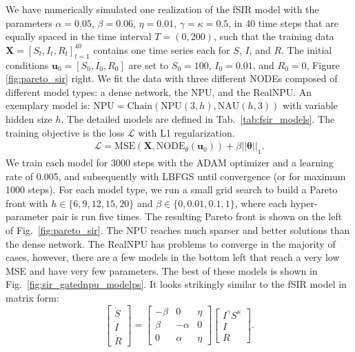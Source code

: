 \documentclass[9pt]{article}
\newcommand{\npu}{\text{NPU}}
\newcommand{\nau}{\text{NAU}}
\newcommand{\chain}{\text{Chain}}
\renewcommand{\arraystretch}{1.2}
\begin{document}
We have numerically simulated one realization of the fSIR model with the
parameters $\alpha=0.05$, $\beta=0.06$, $\eta=0.01$, $\gamma=\kappa=0.5$, in 40
time steps that are equally spaced in the time interval $T=(0,200)$, such that
the training data $\bm X = [S_t,I_t,R_t]_{t=1}^{40}$
contains one time series each for $S$, $I$, and $R$.  The initial conditions
$\bm u_0=[S_0,I_0,R_0]$ are set to $S_0=100$, $I_0=0.01$, and $R_0=0$, Figure
\ref{fig:pareto_sir} right.
We fit the data with three
different NODEs composed of different model types: a dense network, the NPU, and
the RealNPU. An exemplary model is: $\npu=\chain(\npu(3,h),\nau(h,3))$ with
variable hidden size $h$.  The detailed models are defined in
Tab.~\ref{tab:fsir_models}. The training objective is the loss $\mathcal{L}$
with L1 regularization.
\begin{align}
  \label{eq:sir_loss}
  \mathcal{L} = \text{MSE}(\bm X,\text{NODE}_\theta(\bm u_0)) + \beta||\bm\theta||_1.
\end{align}
We train each model for 3000 steps with the ADAM optimizer and a learning rate
of 0.005, and subsequently with LBFGS until convergence (or for maximum 1000
steps).  For each model type, we run a small grid search to build a Pareto front
with $h\in \{6,9,12,15,20\}$ and $\beta\in\{0,0.01,0.1,1\}$, where each
hyper-parameter pair is run five times. The resulting Pareto front is shown on
the left of Fig.~\ref{fig:pareto_sir}. The NPU reaches much sparser and
better solutions than the dense network.
The RealNPU has problems to converge in the majority of cases, however, 
there are a few models in the bottom left that
reach a very low MSE and have very few parameters. The best of these models is
shown in Fig.~\ref{fig:sir_gatednpu_modelps}.  It looks strikingly similar to
the fSIR model in matrix form:
\renewcommand*{\arraystretch}{1.3}
\begin{equation}
  \begin{bmatrix}
    \dot S \\ \dot I \\ \dot R
  \end{bmatrix}
  =
  \begin{bmatrix}
    -\beta & 0 & \eta \\
    \beta & -\alpha & 0 \\
    0 & \alpha & \eta
  \end{bmatrix}
  \begin{bmatrix}
    I^\gamma S^\kappa \\ I \\ R
  \end{bmatrix}.
\end{equation}
\end{document}

